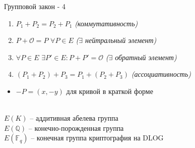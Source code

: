 \documentclass{beamer}
\begin{document}
	\begin{frame}{Групповой закон - 4}%
		\begin{tcolorbox}[colframe=title-and-section-color!120, colback=title-and-section-color!5, title=Теорема, center title]
			\begin{enumerate}
				\item $P_1 + P_2 = P_2 + P_1$ \hfill \textit{(коммутативность)}
				
				\item $P + \mathcal{O} = P$ $\forall P \in E$ \hfill \textit{($\exists$ нейтральный элемент)}
				
				\item $\forall P \in E$ $\exists P' \in E: P + P' = \mathcal{O}$ \hfill \textit{($\exists$ обратный элемент)}
				
				\item $\left( P_1 + P_2 \right) + P_3 = P_1 + \left( P_2 + P_3 \right)$ \hfill \textit{(ассоциативность)}
			\end{enumerate}
		\end{tcolorbox}
		
		\begin{itemize}
			\item $-P = (x,-y)$ для кривой в краткой форме
		\end{itemize}
		
		 \\$
		E(K)$ -- аддитивная абелева группа
		\\
		$E(\mathbb{Q})$ -- конечно-порожденная группа
		\\
		$E(\mathbb{F}_q)$ -- конечная группа \structure{$\Rightarrow$} криптография на DLOG
	\end{frame}
	
\end{document}
